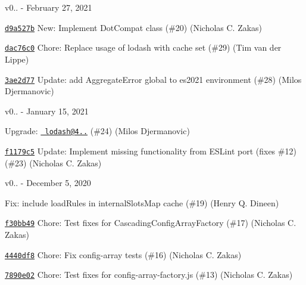 v0.. -\/ February 27, 2021


\begin{DoxyItemize}
\item \href{https://github.com/eslint/eslintrc/commit/d9a527bdb16af46a28d37fa9022131149970a438}{\texttt{ {\ttfamily d9a527b}}} New\+: Implement Dot\+Compat class (\#20) (Nicholas C. Zakas)
\item \href{https://github.com/eslint/eslintrc/commit/dac76c035a9ab9d315050f688867373966aab288}{\texttt{ {\ttfamily dac76c0}}} Chore\+: Replace usage of lodash with cache set (\#29) (Tim van der Lippe)
\item \href{https://github.com/eslint/eslintrc/commit/3ae2d770cb810c026de817e6861e25dac111da9f}{\texttt{ {\ttfamily 3ae2d77}}} Update\+: add Aggregate\+Error global to es2021 environment (\#28) (Milos Djermanovic)
\end{DoxyItemize}

v0.. -\/ January 15, 2021


\begin{DoxyItemize}
\item \href{https://github.com/eslint/eslintrc/commit/51844902bc4132f264f05a0614f2cdeb89290f68}{\texttt{ {}}} Upgrade\+: \href{mailto:lodash@4.17.20}{\texttt{ lodash@4..}} (\#24) (Milos Djermanovic)
\item \href{https://github.com/eslint/eslintrc/commit/f1179c587ae09fabb5c3402598363cfcec2494f7}{\texttt{ {\ttfamily f1179c5}}} Update\+: Implement missing functionality from ESLint port (fixes \#12) (\#23) (Nicholas C. Zakas)
\end{DoxyItemize}

v0.. -\/ December 5, 2020


\begin{DoxyItemize}
\item \href{https://github.com/eslint/eslintrc/commit/17468407c1baf05747cb261c91f7f7b7c2a82422}{\texttt{ {}}} Fix\+: include load\+Rules in internal\+Slots\+Map cache (\#19) (Henry Q. Dineen)
\item \href{https://github.com/eslint/eslintrc/commit/f30bb4935aaf3f4c1b268490da495a59647e58d8}{\texttt{ {\ttfamily f30bb49}}} Chore\+: Test fixes for Cascading\+Config\+Array\+Factory (\#17) (Nicholas C. Zakas)
\item \href{https://github.com/eslint/eslintrc/commit/4440df8237a127e15cbde5c697353e1224f12ec1}{\texttt{ {\ttfamily 4440df8}}} Chore\+: Fix config-\/array tests (\#16) (Nicholas C. Zakas)
\item \href{https://github.com/eslint/eslintrc/commit/7890e027df530a0fb53bcf5751c8c7a008b2a494}{\texttt{ {\ttfamily 7890e02}}} Chore\+: Test fixes for config-\/array-\/factory.\+js (\#13) (Nicholas C. Zakas)
\end{DoxyItemize}

